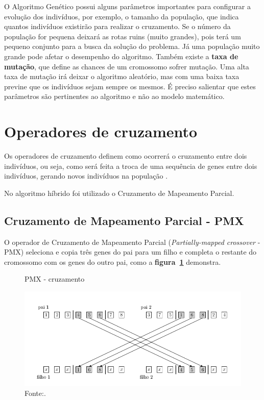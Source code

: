 \documentclass[12pt,openright,a4paper,oneside]{tcc}
\begin{document}
		O Algoritmo Genético possui alguns parâmetros importantes para configurar a evolução dos indivíduos, por exemplo, o tamanho da população, que indica quantos indivíduos existirão para realizar o cruzamento. Se o número da população for pequena deixará as rotas ruins (muito grandes), pois terá um pequeno conjunto para a busca da solução do problema. Já uma população muito grande pode afetar o desempenho do algoritmo. Também  existe a \textbf{taxa de mutação}, que define as chances de um cromossomo sofrer mutação. Uma alta taxa de mutação irá deixar o algoritmo aleatório, mas com uma baixa taxa previne que os indivíduos sejam sempre os mesmos. É preciso salientar que estes parâmetros são pertinentes ao algoritmo e não ao modelo matemático.

		\section{Operadores de cruzamento}

			Os operadores de cruzamento definem como ocorrerá o cruzamento entre dois indivíduos, ou seja, como será feita a troca de uma sequência de genes entre dois indivíduos, gerando novos indivíduos na população \cite{0012-pdf}.

			No algoritmo híbrido foi utilizado o Cruzamento de Mapeamento Parcial.

		\subsection{Cruzamento de Mapeamento Parcial - PMX} 
			\label{Spmx}
			O operador de Cruzamento de Mapeamento Parcial (\textit{Partially-mapped crossover} - PMX)  seleciona e copia três genes do pai para um filho e completa o restante do cromossomo com os genes do outro pai, como a \textbf{figura~\ref{pmx}} demonstra.

			\begin{figure}[h]
				\centering
                \caption{PMX - cruzamento}
		        \includegraphics[width = 14cm,keepaspectratio]{img/pmx.png}
		        \caption*{Fonte:\cite{0012-pdf}.}
		        \label{pmx}
	   		\end{figure}
\end{document}
